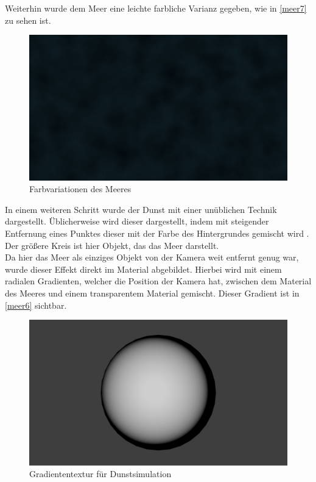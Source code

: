 Weiterhin wurde dem Meer eine leichte farbliche Varianz gegeben, wie in \autoref{meer7} zu sehen ist.

\begin{figure}[H]
\includegraphics[width=\textwidth]{gfx/prod/ocean/meer7.jpg}
\caption{Farbvariationen des Meeres}
\label{meer7}
\end{figure}

In einem weiteren Schritt wurde der Dunst mit einer unüblichen Technik dargestellt. Üblicherweise wird dieser dargestellt, indem mit steigender Entfernung eines Punktes dieser mit der Farbe des Hintergrundes gemischt wird \cite{mist}. Der größere Kreis ist hier Objekt, das das Meer darstellt.\\
Da hier das Meer als einziges Objekt von der Kamera weit entfernt genug war, wurde dieser Effekt direkt im Material abgebildet. Hierbei wird mit einem radialen Gradienten, welcher die Position der Kamera hat, zwischen dem Material des Meeres und einem transparentem Material gemischt. Dieser Gradient ist in \autoref{meer6} sichtbar.

\begin{figure}[H]
\includegraphics[width=\textwidth]{gfx/prod/ocean/meer6.jpg}
\caption{Gradiententextur für Dunstsimulation}
\label{meer6}
\end{figure}

